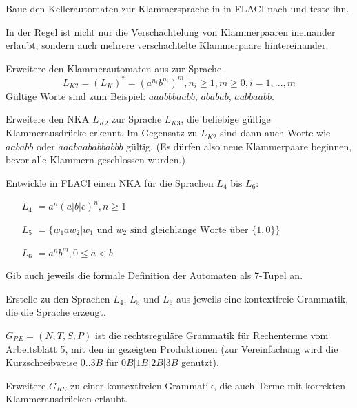 \documentclass[10pt, a4paper]{scrartcl}
\begin{document}
\newpage

\begin{aufgabe}
\label{aufg:nka-klammern}
Baue den Kellerautomaten zur Klammersprache in  in FLACI nach und teste ihn.
\end{aufgabe}

\begin{aufgabe}
\label{aufg:nka-klammern2}
In der Regel ist nicht nur die Verschachtelung von Klammerpaaren ineinander erlaubt, sondern auch mehrere verschachtelte Klammerpaare hintereinander.

\begin{teilaufgaben}
	\teilaufgabe
	Erweitere den Klammerautomaten aus  zur Sprache
	\[ L_{K2} = (L_K)^{*} = (a^{n_i}b^{n_i})^{m}, n_i\geq 1, m\geq 0, i = 1,...,m \]
	Gültige Worte sind zum Beispiel: $aaabbbaabb$, $ababab$, $aabbaabb$.

	\teilaufgabe
	Erweitere den NKA $L_{K2}$ zur Sprache $L_{K3}$, die beliebige gültige Klammerausdrücke erkennt. Im Gegensatz zu $L_{K2}$ sind dann auch Worte wie $aababb$ oder $aaabaababbabbb$ gültig. (Es dürfen also neue Klammerpaare beginnen, bevor alle Klammern geschlossen wurden.)
\end{teilaufgaben}
\end{aufgabe}

\begin{aufgabe}
\label{aufg:nka-uebungen}
Entwickle in FLACI einen NKA für die Sprachen $L_4$ bis $L_6$:

\begin{itemize}
	\item[$L_4$]$ = a^n(a|b|c)^n, n \geq 1$
	\item[$L_5$]$ = \{ w_1 a w_2 | w_1\text{ und }w_2\text{ sind gleichlange Worte über }\{1,0\} \}$
	\item[$L_6$]$ = a^nb^m, 0 \leq a < b$
\end{itemize}

Gib auch jeweils die formale Definition der Automaten als 7-Tupel an.
\end{aufgabe}

\begin{aufgabe}
\label{aufg:grammatik-uebungen}

Erstelle zu den Sprachen $L_4$, $L_5$ und $L_6$ aus  jeweils eine kontextfreie Grammatik, die die Sprache erzeugt.
\end{aufgabe}

\begin{aufgabe}
\label{aufg:grammatik-rechenterme}
$G_{RE} = (N,T,S,P)$ ist die rechtsreguläre Grammatik für Rechenterme vom Arbeitsblatt 5, mit den in  gezeigten Produktionen (zur Vereinfachung wird die Kurzschreibweise $0..3 B$ für $0B|1B|2B|3B$ genutzt).

Erweitere $G_{RE}$ zu einer kontextfreien Grammatik, die auch Terme mit korrekten Klammerausdrücken erlaubt.
\end{aufgabe}
\end{document}
